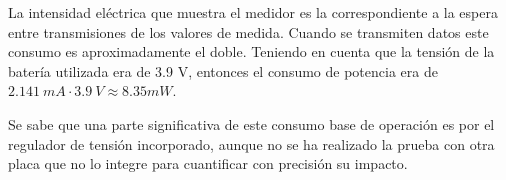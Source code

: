 La intensidad eléctrica que muestra el medidor es la correspondiente a la
espera entre transmisiones de los valores de medida. Cuando se transmiten datos
este consumo es aproximadamente el doble. Teniendo en cuenta que la tensión de
la batería utilizada era de 3.9 V, entonces el consumo de potencia era de
$2.141\ mA \cdot 3.9\ V \approx 8.35 mW$.

Se sabe que una parte significativa de este consumo base de operación es por el
regulador de tensión incorporado, aunque no se ha realizado la prueba con otra
placa que no lo integre para cuantificar con precisión su impacto.